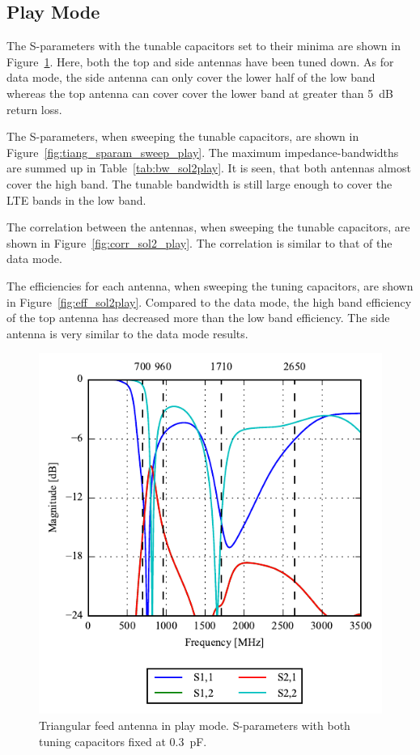 \FloatBarrier
\subsection{Play Mode}

The S-parameters with the tunable capacitors set to their minima are shown in Figure~\ref{fig:triang_sparam_play}. Here, both the top and side antennas have been tuned down. As for data mode, the side antenna can only cover the lower half of the low band whereas the top antenna can cover cover the lower band at greater than \SI{5}{dB} return loss.

The S-parameters, when sweeping the tunable capacitors, are shown in Figure~\ref{fig:tiang_sparam_sweep_play}. The maximum impedance-bandwidths are summed up in Table~\ref{tab:bw_sol2play}. It is seen, that both antennas almost cover the high band. The tunable bandwidth is still large enough to cover the LTE bands in the low band.

The correlation between the antennas, when sweeping the tunable capacitors, are shown in Figure~\ref{fig:corr_sol2_play}. The correlation is similar to that of the data mode.

The efficiencies for each antenna, when sweeping the tuning capacitors, are shown in Figure~\ref{fig:eff_sol2play}. Compared to the data mode, the high band efficiency of the top antenna has decreased more than the low band efficiency. The side antenna is very similar to the data mode results.

\begin{figure}[htbp]
    \centering
    \includegraphics{img/tech_sol/trianglefeed/play_mode/sparams.pdf}
    \caption{Triangular feed antenna in play mode. S-parameters with both tuning capacitors fixed at \SI{0.3}{pF}.}
    \label{fig:triang_sparam_play}
\end{figure}

